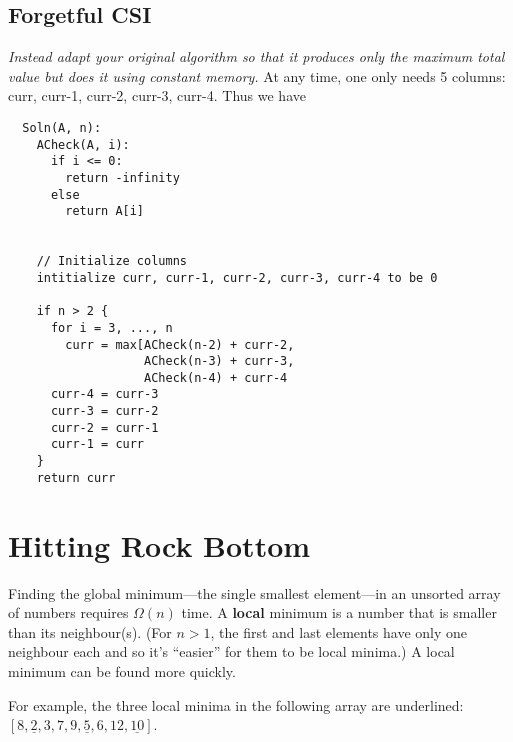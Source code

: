 \documentclass[11pt, oneside]{article}   	%
\theoremstyle{definition}
\theoremstyle{remark}
\begin{document}
\subsection{Forgetful CSI}
\label{sec-2-2}
\textit{Instead adapt your original algorithm so that it produces only the
maximum total value but does it using constant memory.}
At any time, one only needs 5 columns: curr, curr-1, curr-2, curr-3, curr-4. Thus we have
\begin{verbatim}
  Soln(A, n):
    ACheck(A, i):
      if i <= 0:
        return -infinity
      else
        return A[i]
    
    
    // Initialize columns
    intitialize curr, curr-1, curr-2, curr-3, curr-4 to be 0
    
    if n > 2 {
      for i = 3, ..., n
        curr = max[ACheck(n-2) + curr-2,
                   ACheck(n-3) + curr-3,
                   ACheck(n-4) + curr-4
      curr-4 = curr-3
      curr-3 = curr-2
      curr-2 = curr-1
      curr-1 = curr    
    }
    return curr
\end{verbatim}


\section{Hitting Rock Bottom}
\label{sec-3}

Finding the global minimum---the single smallest element---in an
unsorted array of numbers requires $\Omega(n)$ time.  A \textbf{local}
minimum is a number that is smaller than its neighbour(s). (For $n>1$,
the first and last elements have only one neighbour each and so it's
``easier'' for them to be local minima.) A local minimum can be found
more quickly.

For example, the three local minima in the following array are
underlined: $[8, \underline{2}, 3, 7, 9, \underline{5}, 6, 12,
\underline{10}]$.
\end{document}
